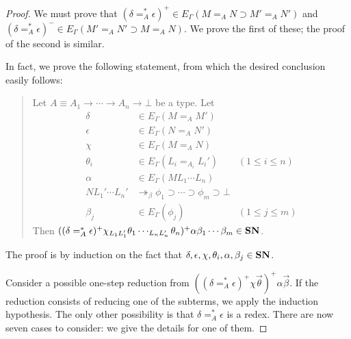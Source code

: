 \begin{proof}
We must prove that $(\delta =_A^* \epsilon)^+ \in E_\Gamma(M =_A N \supset M' =_A N')$ and
$(\delta =_A^* \epsilon)^- \in E_\Gamma(M' =_A N' \supset M =_A N)$.  We prove the first of these; the proof of the second is similar.

In fact, we prove the following statement, from which the desired conclusion easily follows:

\begin{quote}
Let $A \equiv A_1 \rightarrow \cdots \rightarrow A_n \rightarrow \bot$ be a type.  Let
\begin{align*}
\delta & \in E_\Gamma(M =_A M') \\
\epsilon & \in E_\Gamma(N =_A N') \\
\chi & \in E_\Gamma(M =_A N) \\
\theta_i & \in E_\Gamma(L_i =_{A_i} L_i') & (1 \leq i \leq n) \\
\alpha & \in E_\Gamma(M L_1 \cdots L_n) \\
N L_1' \cdots L_n' & \twoheadrightarrow_\beta \phi_1 \supset \cdots \supset \phi_m \supset \bot \\
\beta_j & \in E_\Gamma(\phi_j) & (1 \leq j \leq m)
\end{align*}
Then $((\delta =_A^* \epsilon)^+ \chi_{L_1 L_1'} \theta_1 \cdots_{L_n L_n'} \theta_n)^+ \alpha \beta_1 \cdots \beta_m \in \mathbf{SN}$.
\end{quote}

The proof is by induction on the fact that $\delta, \epsilon, \chi, \theta_i, \alpha, \beta_j \in \mathbf{SN}$.

Consider a possible one-step reduction from $((\delta =_A^* \epsilon)^+ \chi \vec{\theta})^+ \alpha \vec{\beta}$.  If the reduction consists of reducing one of the subterms, we apply the induction hypothesis.  The only other possibility is that $\delta =_A^* \epsilon$ is a redex.  There are now seven cases to consider: we give the details for one of them.


\end{proof}
